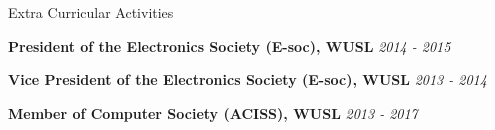 \documentclass[
	11pt, %
]{./../assets/resume} %
\begin{document}




\begin{rSection}{Extra Curricular Activities}

	\textbf{President of the Electronics Society (E-soc), WUSL} \hfill \textit{2014 - 2015}

	\textbf{Vice President of the Electronics Society (E-soc), WUSL} \hfill \textit{2013 - 2014}

	\textbf{Member of Computer Society (ACISS), WUSL} \hfill \textit{2013 - 2017}

\end{rSection}
















\end{document}

